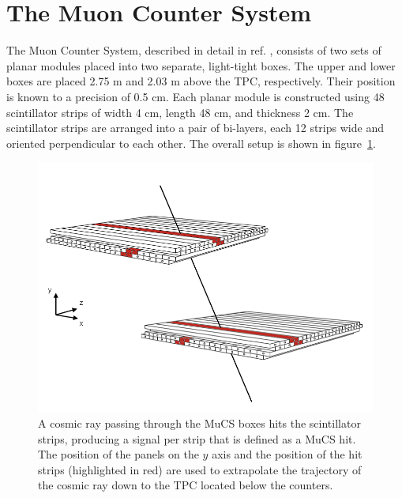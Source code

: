 \documentclass[a4paper,11pt]{article}
\begin{document}

\section{The Muon Counter System}\label{sec:proc}
The Muon Counter System, described in detail in ref. \cite{mucs}, consists of two sets of planar modules placed into two separate, light-tight boxes. The upper and lower boxes are placed 2.75 m and 2.03 m above the TPC, respectively. Their position is known to a precision of 0.5 cm. Each planar module is constructed using 48 scintillator strips of width 4 cm, length 48 cm, and thickness 2 cm. The scintillator strips are arranged into a pair of bi-layers, each 12 strips wide and oriented perpendicular to each other. The overall setup is shown in figure~\ref{fig:boxes}.

\begin{figure}[htbp]
  \begin{center}
    \includegraphics[width=0.7\linewidth]{figures/boxes.png}
    \caption{A cosmic ray passing through the MuCS boxes hits the scintillator strips, producing a signal per strip that is defined as a MuCS hit. The position of the panels on the $y$ axis and the position of the hit strips (highlighted in red) are used to extrapolate the trajectory of the cosmic ray down to the TPC located below the counters.} \label{fig:boxes}
  \end{center}
\end{figure}
\end{document}
